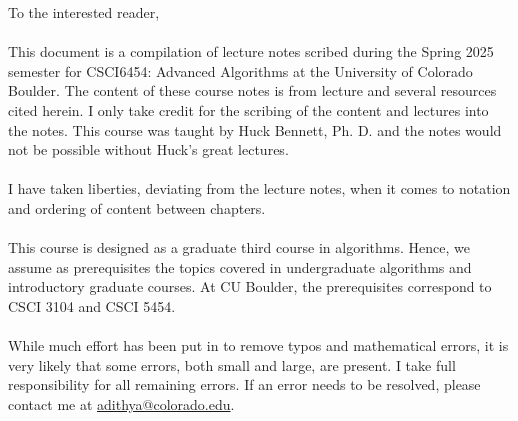 To the interested reader,
\\
\\
This document is a compilation of lecture notes scribed during the Spring 2025 semester for CSCI6454: Advanced Algorithms at the University of Colorado Boulder. The content of these course notes is from lecture and several resources cited herein. I only take credit for the scribing of the content and lectures into the notes. This course was taught by Huck Bennett, Ph. D. and the notes would not be possible without Huck's great lectures.
\\
\\
I have taken liberties, deviating from the lecture notes, when it comes to notation and ordering of content between chapters.
\\
\\
This course is designed as a graduate third course in algorithms. Hence, we assume as prerequisites the topics covered in undergraduate algorithms and introductory graduate courses. At CU Boulder, the prerequisites correspond to CSCI 3104 and CSCI 5454.
\\
\\
While much effort has been put in to remove typos and mathematical errors, it is very likely that some errors, both small and large, are present. I take full responsibility for all remaining errors. If an error needs to be resolved, please contact me at \href{mailto:adithya@colorado.edu}{adithya@colorado.edu}.
\\
\\
\vfill
{}